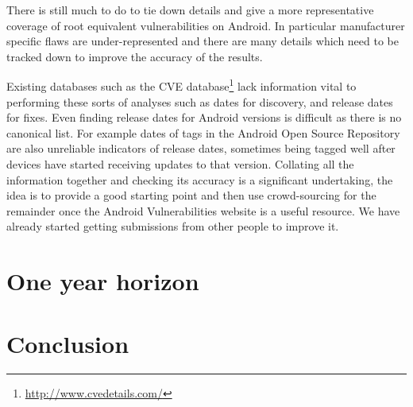 \documentclass[a4paper,twocolumn]{article}
\begin{document}
There is still much to do to tie down details and give a more representative coverage of root equivalent vulnerabilities on Android.
In particular manufacturer specific flaws are under-represented and there are many details which need to be tracked down to improve the accuracy of the results.

Existing databases such as the CVE database\footnote{\url{http://www.cvedetails.com/}} lack information vital to performing these sorts of analyses such as dates for discovery, and release dates for fixes.
Even finding release dates for Android versions is difficult as there is no canonical list.
For example dates of tags in the Android Open Source Repository are also unreliable indicators of release dates, sometimes being tagged well after devices have started receiving updates to that version.
Collating all the information together and checking its accuracy is a significant undertaking, the idea is to provide a good starting point and then use crowd-sourcing for the remainder once the Android Vulnerabilities website is a useful resource.
We have already started getting submissions from other people to improve it.


\section*{One year horizon}

\section*{Conclusion}

\printbibliography
\end{document}
